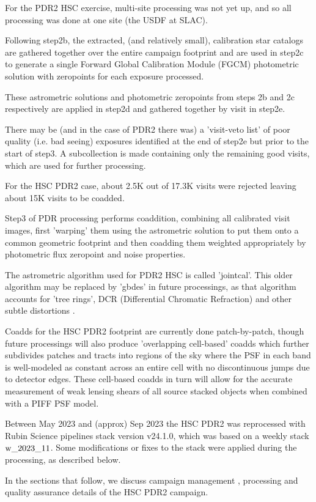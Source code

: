 For the PDR2 HSC exercise, multi-site processing was not yet up, 
and so all processing was done at one site (the USDF at SLAC).

Following step2b, the extracted, (and relatively small),
calibration star catalogs are gathered together over the entire campaign
footprint and are used in step2c to generate a single Forward 
Global Calibration Module (FGCM) photometric solution with zeropoints for
each exposure processed.

These astrometric solutions and photometric zeropoints from steps 2b and 2c
respectively are applied in step2d and gathered together by visit in step2e.

There may be (and in the case of PDR2 there was) a 'visit-veto list' of 
poor quality (i.e. bad seeing) exposures identified at the end of step2e but 
prior to the start of step3.  A subcollection is made containing only 
the remaining good visits, which are used for further processing.  

For the HSC PDR2 case, about 2.5K out of 17.3K visits were rejected 
leaving about 15K visits to be coadded.

Step3 of PDR processing performs coaddition, combining all calibrated 
visit images, first 'warping' them using the astrometric solution to put 
them onto a common geometric footprint and then coadding them weighted 
appropriately by photometric flux zeropoint and noise properties.

The astrometric algorithm used for PDR2 HSC is called 'jointcal'.  This
older algorithm may be replaced by 'gbdes' in future processings, as that
algorithm accounts for 'tree rings', DCR 
(Differential Chromatic Refraction) and other subtle distortions .

Coadds for the HSC PDR2 footprint are currently done patch-by-patch,
though future processings will also produce 'overlapping cell-based' 
coadds  which further subdivides patches and tracts into regions of 
the sky where the PSF in each band is well-modeled as constant 
across an entire cell with no discontinuous jumps due to detector edges.
These cell-based coadds in turn will allow for the accurate measurement of 
weak lensing shears of all source stacked objects when combined with
a PIFF PSF model.

Between May 2023 and (approx) Sep 2023 the HSC PDR2 was reprocessed with 
Rubin Science pipelines stack version v24.1.0, which was 
based on a weekly stack $\rm w\_2023\_11$.  Some modifications or fixes 
to the stack were applied during the processing, as described below.

In the sections that follow, we discuss campaign 
management , 
processing  and quality 
assurance  details of the HSC PDR2 campaign.



